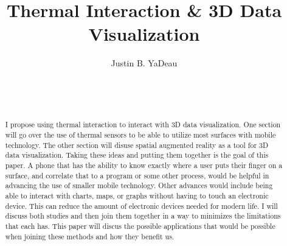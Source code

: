 \documentclass{sig-alternate}
\begin{document}

\title{Thermal Interaction \& 3D Data Visualization}


\author{
\alignauthor
Justin B. YaDeau\\
	\\
	\\
	\\
}

\maketitle

\begin{abstract}
I propose using thermal interaction to interact with 3D data visualization. One section will go over the use of thermal sensors to be able to utilize most surfaces with mobile technology. The other section will disuse spatial augmented reality as a tool for 3D data visualization. Taking these ideas and putting them together is the goal of this paper. A phone that has the ability to know exactly where a user puts their finger on a surface, and correlate that to a program or some other process, would be helpful in advancing the use of smaller mobile technology. Other advances would include being able to interact with charts, maps, or graphs without having to touch an electronic device. This can reduce the amount of electronic devices needed for modern life. I will discuss both studies and then join them together in a way to minimizes the limitations that each has. This paper will discus the possible applications that would be possible when joining these methods and how they benefit us.
\end{abstract}

\end{document}
